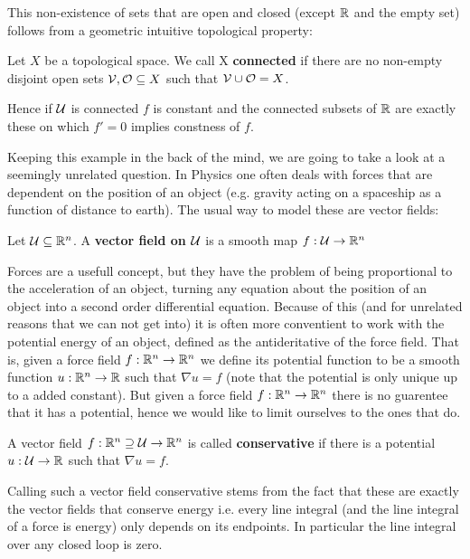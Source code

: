 This non-existence of sets that are open and closed (except $\mathbb{R}$ and the empty set) follows from a
geometric intuitive topological property:
\begin{definition}
	Let $X$ be a topological space. We call X \textbf{connected} if there are no non-empty
	disjoint open sets $\mathcal{V}, \mathcal{O} \subseteq X$ such that $\mathcal{V} \cup \mathcal{O} = X$.
\end{definition}
Hence if $\mathcal{U}$ is connected $f$ is constant and the connected subsets of $\mathbb{R}$ are exactly
these on which $f' = 0$ implies constness of $f$.

Keeping this example in the back of the mind, we are going to take a look at a seemingly unrelated
question. In Physics one often deals with forces that are dependent on the position of an object (e.g. gravity
acting on a spaceship as a function of distance to earth). The usual way to model these are vector fields:
\begin{definition}
Let $\mathcal{U} \subseteq \mathbb{R}^n$. A \textbf{vector field on $\mathcal{U}$} is a smooth map $f: \mathcal{U} \to \mathbb{R}^n$
\end{definition}

Forces are a usefull concept, but they have the problem of being proportional to the acceleration
of an object, turning any equation about the position of an object into a second order differential
equation. Because of this (and for unrelated reasons that we can not get into) it is often more conventient
to work with the potential energy of an object, defined as the antideritative of the force field. That is,
given a  force field $f: \mathbb{R}^n \to \mathbb{R}^n$ we define its potential function to be a smooth function $u: \mathbb{R}^n \to \mathbb{R}$
such that $\nabla u = f$ (note that the potential is only unique up to a added constant). But given a force field $f: \mathbb{R}^n \to \mathbb{R}^n$
there is no guarentee that it has a potential, hence we would like to limit ourselves to the ones that do.
\begin{definition}
A vector field $f: \mathbb{R}^n \supseteq \mathcal{U} \to \mathbb{R}^n$ is called \textbf{conservative} if there is a potential $u: \mathcal{U} \to \mathbb{R}$
such that $\nabla u = f$.
\end{definition}
Calling such a vector field conservative stems from the fact that these are exactly the vector
fields that conserve energy i.e. every line integral (and the line integral of a force is
energy) only depends on its endpoints. In particular the line integral over any closed loop is
zero.

